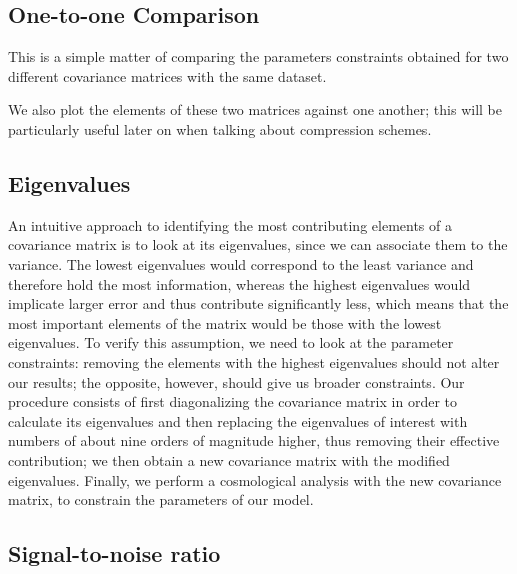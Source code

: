 \documentclass[twocolumn]{\docclass}
\begin{document}
	\subsection{One-to-one Comparison}
	
	This is a simple matter of comparing the parameters constraints obtained for two different covariance matrices with the same dataset. 
	
	We also plot the elements of these two matrices against one another; this will be particularly useful later on when talking about compression schemes.
	
	
	\subsection{Eigenvalues}
	
	An intuitive approach to identifying the most contributing elements of a covariance matrix is to look at its eigenvalues, since we can associate them to the variance. The lowest eigenvalues would correspond to the least variance and therefore hold the most information, whereas the highest eigenvalues would implicate larger error and thus contribute significantly less, which means that the most important elements of the matrix would be those with the lowest eigenvalues. To verify this assumption, we need to look at the parameter constraints: removing the elements with the highest eigenvalues should not alter our results; the opposite, however, should give us broader constraints. Our procedure consists of first diagonalizing the covariance matrix in order to calculate its eigenvalues and then replacing the eigenvalues of interest with numbers of about nine orders of magnitude higher, thus removing their effective contribution; we then obtain a new covariance matrix with the modified eigenvalues. Finally, we perform a cosmological analysis with the new covariance matrix, to constrain the parameters of our model. 
	
	
	\subsection{Signal-to-noise ratio}
	
\end{document}
